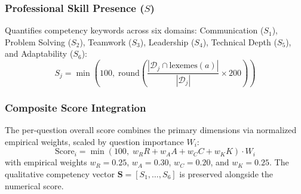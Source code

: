 \documentclass[conference]{IEEEtran}
\begin{document}
\subsubsection{Professional Skill Presence ($S$)}
Quantifies competency keywords across six domains: Communication ($S_1$), Problem Solving ($S_2$), Teamwork ($S_3$), Leadership ($S_4$), Technical Depth ($S_5$), and Adaptability ($S_6$):
\begin{equation}
S_j = \min\left(100, \; \text{round}\left(\frac{|\mathcal{D}_j \cap \text{lexemes}(a)|}{|\mathcal{D}_j|} \times 200\right)\right)
\end{equation}

\subsubsection{Composite Score Integration}
The per-question overall score combines the primary dimensions via normalized empirical weights, scaled by question importance $W_i$:
\begin{equation}
\label{eq:overall_score}
\text{Score}_i = \min\left(100, \; w_R R + w_A A + w_C C + w_K K\right) \cdot W_i
\end{equation}
with empirical weights $w_R = 0.25$, $w_A = 0.30$, $w_C = 0.20$, and $w_K = 0.25$. The qualitative competency vector $\mathbf{S} = [S_1, \dots, S_6]$ is preserved alongside the numerical score.
\end{document}
